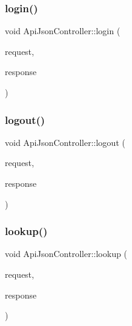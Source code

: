 \mbox{\label{classApiJsonController_a6f3831b46ccd2b684256d8475de08e50}} 
\subsubsection{\texorpdfstring{login()}{login()}}
{\footnotesize\ttfamily void Api\+Json\+Controller\+::login (\begin{DoxyParamCaption}\item[{Mongoose\+::\+Request \&}]{request,  }\item[{Mongoose\+::\+Json\+Response \&}]{response }\end{DoxyParamCaption})}

\mbox{\label{classApiJsonController_adc58c5ee867cd7ebd906a93c2ab66e23}} 
\subsubsection{\texorpdfstring{logout()}{logout()}}
{\footnotesize\ttfamily void Api\+Json\+Controller\+::logout (\begin{DoxyParamCaption}\item[{Mongoose\+::\+Request \&}]{request,  }\item[{Mongoose\+::\+Json\+Response \&}]{response }\end{DoxyParamCaption})}

\mbox{\label{classApiJsonController_aa9906398a092a9a617dd4833175c6eba}} 
\subsubsection{\texorpdfstring{lookup()}{lookup()}}
{\footnotesize\ttfamily void Api\+Json\+Controller\+::lookup (\begin{DoxyParamCaption}\item[{Mongoose\+::\+Request \&}]{request,  }\item[{Mongoose\+::\+Json\+Response \&}]{response }\end{DoxyParamCaption})}

